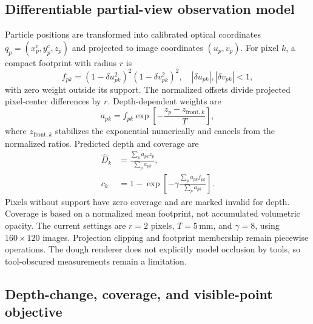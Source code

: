 \subsection{Differentiable partial-view observation model}

Particle positions are transformed into calibrated optical coordinates $q_p=(x_p^c,y_p^c,z_p)$ and projected to image coordinates $(u_p,v_p)$. For pixel $k$, a compact footprint with radius $r$ is
\begin{equation}
 f_{pk}=(1-\delta u_{pk}^2)^2(1-\delta v_{pk}^2)^2,
 \quad |\delta u_{pk}|,|\delta v_{pk}|<1,
\end{equation}
with zero weight outside its support. The normalized offsets divide projected pixel-center differences by $r$. Depth-dependent weights are
\begin{equation}
 a_{pk}=f_{pk}\exp\!\left[-\frac{z_p-z_{\mathrm{front},k}}{T}\right],
\end{equation}
where $z_{\mathrm{front},k}$ stabilizes the exponential numerically and cancels from the normalized ratios. Predicted depth and coverage are
\begin{equation}
 \begin{aligned}
 \hat D_k&=\frac{\sum_p a_{pk}z_p}{\sum_p a_{pk}},\\
 c_k&=1-\exp\!\left[-\gamma
          \frac{\sum_p a_{pk}f_{pk}}{\sum_p a_{pk}}\right].
 \end{aligned}
 \label{eq:render}
\end{equation}
Pixels without support have zero coverage and are marked invalid for depth. Coverage is based on a normalized mean footprint, not accumulated volumetric opacity. The current settings are $r=2$ pixels, $T=5\,\mathrm{mm}$, and $\gamma=8$, using $160\times120$ images. Projection clipping and footprint membership remain piecewise operations. The dough renderer does not explicitly model occlusion by tools, so tool-obscured measurements remain a limitation.

\subsection{Depth-change, coverage, and visible-point objective}

